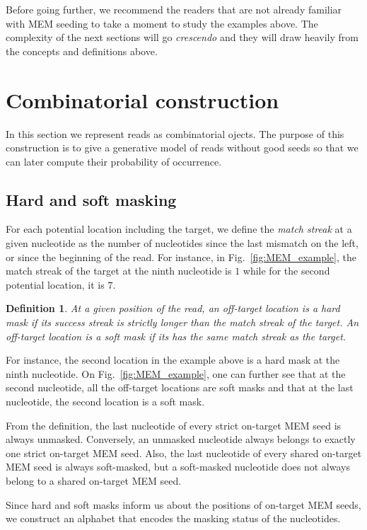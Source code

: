 \documentclass{article}
\newtheorem{definition}{Definition}
\begin{document}
Before going further, we recommend the readers that are not already
familiar with MEM seeding to take a moment to study the examples above.
The complexity of the next sections will go \textit{crescendo} and they
will draw heavily from the concepts and definitions above.


\section{Combinatorial construction}

In this section we represent reads as combinatorial ojects. The purpose of
this construction is to give a generative model of reads without good
seeds so that we can later compute their probability of occurrence.

\subsection{Hard and soft masking}

For each potential location including the target, we define the
\emph{match streak} at a given nucleotide as the number of nucleotides
since the last mismatch on the left, or since the beginning of the read.
For instance, in Fig.~\ref{fig:MEM_example}, the match streak of the
target at the ninth nucleotide is $1$ while for the second potential
location, it is $7$.

\begin{definition}
At a given position of the read, an off-target location is a \emph{hard
mask} if its success streak is strictly longer than the match streak of
the target. An off-target location is a \emph{soft mask} if its has the
same match streak as the target.
\end{definition}

For instance, the second location in the example above is a hard mask at
the ninth nucleotide. On Fig.~\ref{fig:MEM_example}, one can further see
that at the second nucleotide, all the off-target locations are soft masks
and that at the last nucleotide, the second location is a soft mask.

From the definition, the last nucleotide of every strict on-target MEM
seed is always unmasked. Conversely, an unmasked nucleotide always belongs
to exactly one strict on-target MEM seed. Also, the last nucleotide of
every shared on-target MEM seed is always soft-masked, but a soft-masked
nucleotide does not always belong to a shared on-target MEM seed.

Since hard and soft masks inform us about the positions of on-target
MEM seeds, we construct an alphabet that encodes the masking status of the
nucleotides.
\end{document}
